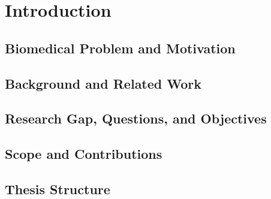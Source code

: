 \chapter{Introduction}
\label{ch:introduction}

\section{Biomedical Problem and Motivation}

\section{Background and Related Work}

\section{Research Gap, Questions, and Objectives}

\section{Scope and Contributions}

\section{Thesis Structure}
